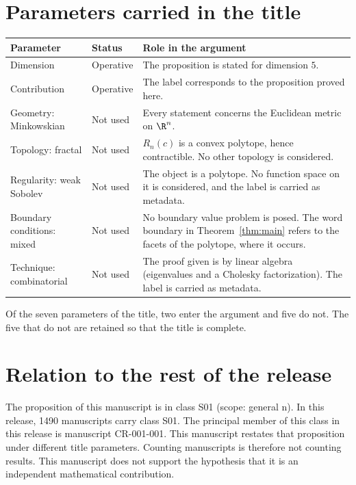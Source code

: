 \documentclass[11pt]{article}
\begin{document}
\section{Parameters carried in the title}\label{sec:params}
\begin{center}
\small
\begin{tabular}{p{}p{}p{}}
\toprule
Parameter & Status & Role in the argument \\
\midrule
Dimension & Operative & The proposition is stated for dimension $5$. \\
Contribution & Operative & The label corresponds to the proposition proved here. \\
Geometry: Minkowskian & Not used & Every statement concerns the Euclidean metric on $\R^n$. \\
Topology: fractal & Not used & $R_n(c)$ is a convex polytope, hence contractible. No other topology is considered. \\
Regularity: weak Sobolev & Not used & The object is a polytope. No function space on it is considered, and the label is carried as metadata. \\
Boundary conditions: mixed & Not used & No boundary value problem is posed. The word boundary in Theorem~\ref{thm:main} refers to the facets of the polytope, where it occurs. \\
Technique: combinatorial & Not used & The proof given is by linear algebra (eigenvalues and a Cholesky factorization). The label is carried as metadata. \\
\bottomrule
\end{tabular}
\end{center}
Of the seven parameters of the title, two enter the argument and five do not. The five that do not are retained so that the title is complete.

\section{Relation to the rest of the release}
The proposition of this manuscript is in class S01 (scope: general n).
In this release, 1490 manuscripts carry class S01. The principal member of this class in this release is manuscript CR-001-001. This manuscript restates that proposition under different title parameters.
Counting manuscripts is therefore not counting results. This manuscript does not support the hypothesis that it is an independent mathematical contribution.
\end{document}
